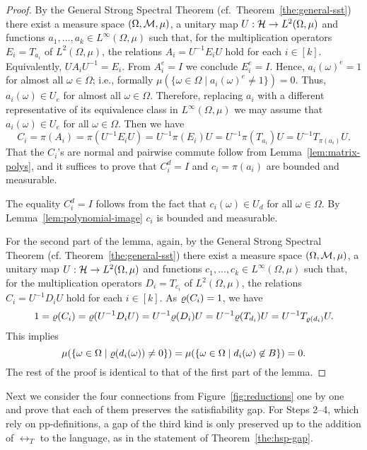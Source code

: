 \documentclass[11pt,letter]{article}
\begin{document}
\begin{proof}
By the General Strong Spectral Theorem (cf.~Theorem~\ref{the:general-sst}) there exist a measure space $(\Omega,{\mathcal M},\mu)$, a unitary map $U:{\mathcal H}\to L^2(\Omega,\mu)$ and functions $a_1,\dots,a_k\in L^\infty(\Omega,\mu)$ such
that, for the multiplication operators $E_i = T_{a_i}$ of $L^2(\Omega,\mu)$, the relations $A_i = U^{-1} E_iU$ hold for each $i\in [k]$. Equivalently,
$U A_iU^{-1} = E_i$. From $A_i^e=I$ we conclude $E_i^e=I$. Hence, $a_i(\omega)^e = 1$ for almost all $\omega\in\Omega$; i.e., formally $\mu(\{\omega\in\Omega\mid a_i(\omega)^e\ne1\}) = 0$. Thus, $a_i(\omega)\in U_e$ for almost all $\omega\in\Omega$. Therefore, replacing $a_i$ with a different representative of its equivalence class in $L^\infty(\Omega,\mu)$ we may assume that $a_i(\omega)\in U_e$ for all $\omega\in\Omega$. Then we have 
\[
C_i=\pi(A_i)=\pi(U^{-1}E_iU)=U^{-1}\pi(E_i)U=U^{-1}\pi(T_{a_i})U=U^{-1}T_{\pi(a_i)}U.
\]
That the $C_i$'s are normal and pairwise commute follow from Lemma~\ref{lem:matrix-polys}, and it suffices to prove that $C^d_i=I$ and $c_i=\pi(a_i)$ are bounded and measurable.

The equality $C^d_i=I$ follows from the fact that $c_i(\omega)\in U_d$ for all $\omega\in\Omega$. By Lemma~\ref{lem:polynomial-image} $c_i$ is bounded and measurable. 

For the second part of the lemma, again, by the General Strong Spectral Theorem (cf. Theorem~\ref{the:general-sst}) there exist a measure space $(\Omega,{\mathcal M},\mu)$, a unitary map $U:{\mathcal H}\to L^2(\Omega,\mu)$ and functions $c_1,\dots,c_k\in L^\infty(\Omega,\mu)$ such
that, for the multiplication operators $D_i = T_{c_i}$ of $L^2(\Omega,\mu)$, the relations $C_i = U^{-1} D_iU$ hold for each $i\in [k]$. As $\varrho(C_i)=1$, we have 
\[
1=\varrho(C_i)=\varrho(U^{-1}D_iU)=U^{-1}\varrho(D_i)U=U^{-1}\varrho(T_{d_i})U=U^{-1}T_{\varrho(d_i)}U.
\]
This implies 
\[
\mu(\{\omega\in\Omega\mid \varrho(d_i(\omega))\ne0\})=\mu(\{\omega\in\Omega\mid d_i(\omega)\not\in B\}) = 0.
\]
The rest of the proof is identical to that of the first part of the lemma.
\end{proof}


Next we consider the four connections from Figure~\ref{fig:reductions} one by
one and prove that each of them preserves the satisfiability gap. For Steps
2--4, which rely on pp-definitions, a gap of the third kind is only preserved up
to the addition of $\rel_T$ to the language, as in the statement of
Theorem~\ref{the:hsp-gap}.

\smallskip
\end{document}
